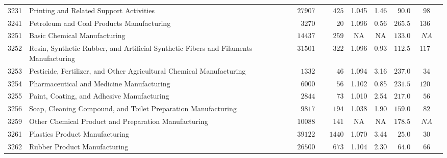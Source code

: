 \documentclass[9pt, oneside]{article}   	%
\begin{document}
\begin{longtable}{lp{3 in}ccccccc}
3231  & Printing and Related Support Activities & $\phantom{0}27907$ & $\phantom{000}425$ & 1.045 &  1.46 & $\phantom{0}90.0$ & $\phantom{0}98$ \\
3241  & Petroleum and Coal Products Manufacturing & $\phantom{00}3270$ & $\phantom{0000}20$ & 1.096 &  0.56 & $265.5$ & $136$ \\
3251  & Basic Chemical Manufacturing & $\phantom{0}14437$ & $\phantom{000}259$ &    NA &    NA & $133.0$ & $\phantom{0}NA$ \\
3252  & Resin, Synthetic Rubber, and Artificial Synthetic Fibers and Filaments Manufacturing & $\phantom{0}31501$ & $\phantom{000}322$ & 1.096 &  0.93 & $112.5$ & $117$ \\
3253  & Pesticide, Fertilizer, and Other Agricultural Chemical Manufacturing & $\phantom{00}1332$ & $\phantom{0000}46$ & 1.094 &  3.16 & $237.0$ & $\phantom{0}34$ \\
3254  & Pharmaceutical and Medicine Manufacturing & $\phantom{00}6000$ & $\phantom{0000}56$ & 1.102 &  0.85 & $231.5$ & $120$ \\
3255  & Paint, Coating, and Adhesive Manufacturing & $\phantom{00}2844$ & $\phantom{0000}73$ & 1.010 &  2.54 & $217.0$ & $\phantom{0}56$ \\
3256  & Soap, Cleaning Compound, and Toilet Preparation Manufacturing & $\phantom{00}9817$ & $\phantom{000}194$ & 1.038 &  1.90 & $159.0$ & $\phantom{0}82$ \\
3259  & Other Chemical Product and Preparation Manufacturing & $\phantom{0}10088$ & $\phantom{000}141$ &    NA &    NA & $178.5$ & $\phantom{0}NA$ \\
3261  & Plastics Product Manufacturing & $\phantom{0}39122$ & $\phantom{00}1440$ & 1.070 &  3.44 & $\phantom{0}25.0$ & $\phantom{0}30$ \\
3262  & Rubber Product Manufacturing & $\phantom{0}26500$ & $\phantom{000}673$ & 1.104 &  2.30 & $\phantom{0}64.0$ & $\phantom{0}66$ \\


\end{longtable}
\end{document}
